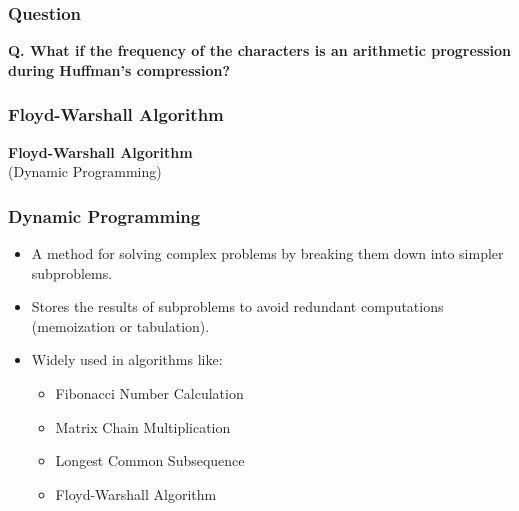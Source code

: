\documentclass[10pt,aspectratio=43]{beamer}
\begin{document}
\begin{frame}
    \frametitle{\textcolor{myMaroon}Question}

    \begin{center}
        \begin{tcolorbox}[
            colback=gray!10,
            colframe=black!60,
            boxrule=0.5pt,
            width=9.5cm,
            halign=left
        ]
            \small
            \textbf{Q. What if the frequency of the characters is an arithmetic progression during Huffman's compression?}
        \end{tcolorbox}
    \end{center}

\end{frame}


\begin{frame}
    \frametitle{\textcolor{myMaroon}{Floyd-Warshall Algorithm}}
    \begin{center}
        {\Large \textbf{\textcolor{myMaroon}{Floyd-Warshall Algorithm}}} \\
        \vspace{0.3cm}
        {\large \textcolor{myBlue}{(Dynamic Programming)}}
    \end{center}

\end{frame}

\begin{frame}
    \frametitle{\textcolor{myMaroon}{Dynamic Programming}}
    \begin{itemize}
        \item A method for solving complex problems by breaking them down into simpler subproblems.

        \vspace{0.4cm}
        \item Stores the results of subproblems to avoid redundant computations (memoization or tabulation).

        \vspace{0.4cm}
        \item Widely used in algorithms like:
        \begin{itemize}
            \item Fibonacci Number Calculation
            \item Matrix Chain Multiplication
            \item Longest Common Subsequence
            \item Floyd-Warshall Algorithm
        \end{itemize}
    \end{itemize}
\end{frame}
\end{document}
